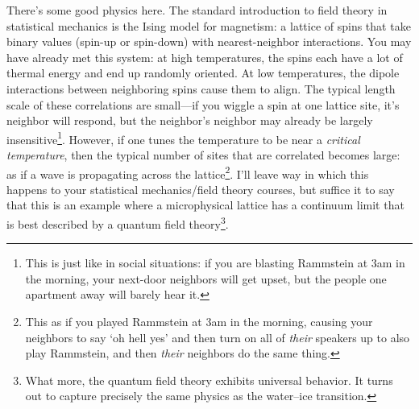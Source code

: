 There's some good physics here. The standard introduction to field theory in statistical mechanics is the Ising model for magnetism: a lattice of spins that take binary values (spin-up or spin-down) with nearest-neighbor interactions. You may have already met this system: at high temperatures, the spins each have a lot of thermal energy and end up randomly oriented. At low temperatures, the dipole interactions between neighboring spins cause them to align. The typical length scale of these correlations are small---if you wiggle a spin at one lattice site, it's neighbor will respond, but the neighbor's neighbor may already be largely insensitive\footnote{This is just like in social situations: if you are blasting Rammstein at 3am in the morning, your next-door neighbors will get upset, but the people one apartment away will barely hear it.}. However, if one tunes the temperature to be near a \emph{critical temperature}, then the typical number of sites that are correlated becomes large: as if a wave is propagating across the lattice\footnote{This as if you played Rammstein at 3am in the morning, causing your neighbors to say `oh hell yes' and then turn on all of \emph{their} speakers up to also play Rammstein, and then \emph{their} neighbors do the same thing.}. I'll leave way in which this happens to your statistical mechanics/field theory courses, but suffice it to say that this is an example where a microphysical lattice has a continuum limit that is best described by a quantum field theory\footnote{What more, the quantum field theory exhibits universal behavior. It turns out to capture precisely the same physics as the water--ice transition.}. 


